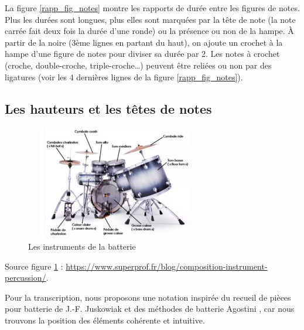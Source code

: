 La figure \ref{rapp_fig_notes} montre les rapports de durée entre les figures de notes. Plus les durées sont longues, plus elles sont marquées par la tête de note (la note carrée fait deux fois la durée d’une ronde) ou la présence ou non de la hampe. À partir de la noire (3ème lignes en partant du haut), on ajoute un crochet à la hampe d’une figure de notes pour diviser sa durée par 2. 
Les notes à crochet (croche, double-croche, triple-croche…) 
peuvent être reliées ou non par des ligatures (voir les 4 dernières lignes de la figure \ref{rapp_fig_notes}).

\subsection*{Les hauteurs et les têtes de notes}
\begin{figure}[h]
    \centering
    \includegraphics[height=50mm, width=80mm]{z_images/3_methodes/0_notation_de_la_batterie/batterie.png}
    \caption{Les instruments de la batterie}
    \label{instru_drum}
\end{figure}

Source figure \ref{instru_drum} : \url{https://www.superprof.fr/blog/composition-instrument-percussion/}.

Pour la transcription, nous proposons une notation inspirée du recueil de pièces pour batterie de J.-F. Juskowiak \cite{jusko} et des méthodes de batterie Agostini \cite{ago_meth_3}, car nous trouvons la position des éléments cohérente et intuitive.

